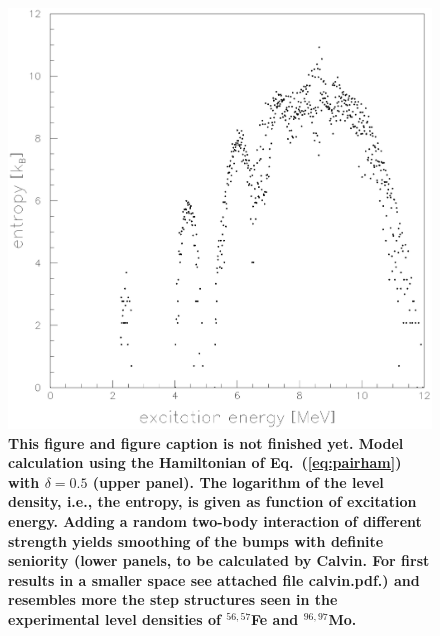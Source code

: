 \begin{figure}\centering
\includegraphics[totalheight=8.9cm]{fig5.eps}
\caption{\bf This figure and figure caption is not finished yet. \rm 
Model calculation using the Hamiltonian of Eq.\ 
(\protect\ref{eq:pairham}) with $\delta=0.5$ (upper panel). The logarithm of 
the level density, i.e., the entropy, is given as function of excitation 
energy. Adding a random two-body interaction of different strength yields
smoothing of the bumps with definite seniority (lower panels, to be calculated
by Calvin. For first results in a smaller space see attached file calvin.pdf.) 
and resembles more the step structures seen in the experimental level densities
of $^{56,57}$Fe and $^{96,97}$Mo.}
\label{fig:calc}
\end{figure}


